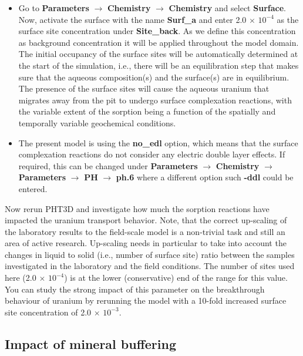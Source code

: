 \begin{itemize}
\item Go to 
{\color{blue}\textbf{Parameters}}
$\rightarrow$ {\color{blue}\textbf{Chemistry}} 
$\rightarrow$ {\color{blue}\textbf{Chemistry}}
and select {\color{blue}\textbf{Surface}}.
Now, activate the surface with the name {\color{blue}\textbf{Surf\_a}} 
and enter 2.0 $\times$ $10^{-4}$ as the surface site
concentration under {\color{blue}\textbf{Site\_back}}.
As we define this concentration as background concentration
it will be applied throughout the model domain.
The initial occupancy of the surface sites will be automatically 
determined at the start of the simulation, i.e., there will be 
an equilibration step that makes sure that the aqueous composition(s)
and the surface(s) are in equilibrium.
The presence of the surface sites will cause the aqueous uranium 
that migrates away from the pit to undergo surface complexation reactions,
with the variable extent of the sorption being a function 
of the spatially and temporally variable geochemical conditions.
\item The present model is using the {\color{blue}\textbf{no\_edl}} 
option, which means that the surface complexation reactions
do not consider any electric double layer effects.
If required, this can be changed under 
{\color{blue}\textbf{Parameters}}
$\rightarrow$ {\color{blue}\textbf{Chemistry}} 
$\rightarrow$ {\color{blue}\textbf{Parameters}}
$\rightarrow$ {\color{blue}\textbf{PH}}
$\rightarrow$ {\color{blue}\textbf{ph.6}}
where a different option such  {\color{blue}\textbf{-ddl}} 
could be entered. 
\end{itemize}

Now rerun PHT3D and investigate how much the sorption reactions have impacted 
the uranium transport behavior. Note, that the correct up-scaling of the 
laboratory results to the field-scale model is a non-trivial task 
and still an area of active research. Up-scaling needs in particular to take into 
account the changes in liquid to solid (i.e., number of surface site) 
ratio between the samples investigated in the laboratory and the 
field conditions. The number of sites used here (2.0 $\times$ $10^{-4}$)
is at the lower (conservative) end of the range for this value.  
You can study the strong impact of this parameter on the breakthrough 
behaviour of uranium by rerunning the model with a 10-fold increased
surface site concentration of 2.0 $\times$ $10^{-3}$.    

\subsection{Impact of mineral buffering}


